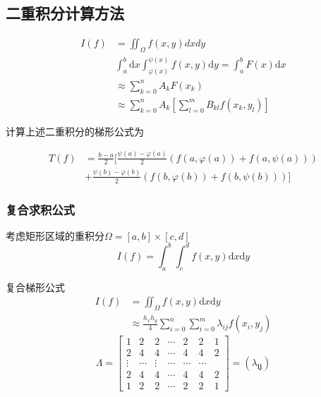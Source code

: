 \subsection{二重积分计算方法}
\[
    \begin{aligned}
        I(f)&=\iint_{\Omega}f(x,y)dxdy\\
        & \int_a^b\mathrm{d}x\int_{\varphi(x)}^{\psi(x)}f(x,y)\mathrm{d}y = \int_{a}^{b}F(x)\mathrm{d}x \\
        & \approx\sum_{k = 0}^{n} A_{k}F(x_k)\\
        &\approx\sum_{k=0}^{n}A_{k}\left[\sum_{l=0}^{m}B_{kl}f(x_{k},y_{l})\right]
    \end{aligned}
\]

\begin{example}
    计算上述二重积分的梯形公式为
    \begin{solution}
        \[
            \begin{aligned}
                T(f)&=\frac{b-a}{2}[\frac{\psi(a)-\varphi(a)}{2}(f(a,\varphi(a))+f(a,\psi(a)))\\
                &+\frac{\psi(b)-\varphi(b)}{2}(f(b,\varphi(b))+f(b,\psi(b)))]
            \end{aligned}
        \]
    \end{solution}
\end{example}
\subsubsection{复合求积公式}
考虑矩形区域的重积分$\Omega=[a,b]\times[c,d]$
\[
    I(f)=\int_{a}^{b}\int_{c}^{d}f(x,y)\mathrm{d}x\mathrm{d}y
\]
\begin{note}
    复合梯形公式
    \[
        \begin{aligned}
            I(f)& =\iint_{\Omega}f(x,y)\mathrm{d}x\mathrm{d}y \\
            &\approx\frac{h_{x}h_{y}}{4}\sum_{i=0}^{n}\sum_{i=0}^{m}\lambda_{ij}f(x_{i},y_{j})
        \end{aligned}
    \]
    \[
        \Lambda=
        \begin{bmatrix}
            1&2&2&\cdots&2&2&1\\
            2&4&4&\cdots&4&4&2\\
            \vdots&\cdots&\vdots&\cdots&\cdots&\cdots\\
            2&4&4&\cdots&4&4&2\\
            1&2&2&\cdots&2&2&1
        \end{bmatrix}
        =(\lambda_{\mathbf{ij}})
    \]
\end{note}
